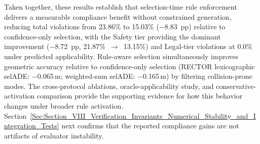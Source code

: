 Taken together, these results establish that selection-time rule enforcement delivers a measurable compliance benefit without constrained generation, reducing total violations from 23.86\% to 15.03\% ($-$8.83~pp) relative to confidence-only selection, with the Safety tier providing the dominant improvement ($-$8.72~pp, 21.87\%~$\to$~13.15\%) and Legal-tier violations at 0.0\% under predicted applicability.  Rule-aware selection simultaneously improves geometric accuracy relative to confidence-only selection (RECTOR lexicographic selADE: $-$0.065\,m; weighted-sum selADE: $-$0.165\,m) by filtering collision-prone modes.  The cross-protocol ablations, oracle-applicability study, and conservative-activation comparison provide the supporting evidence for how this behavior changes under broader rule activation.  Section~\ref{Sec:Section_VIII_Verification_Invariants_Numerical_Stability_and_Integration_Tests} next confirms that the reported compliance gains are not artifacts of evaluator instability.
